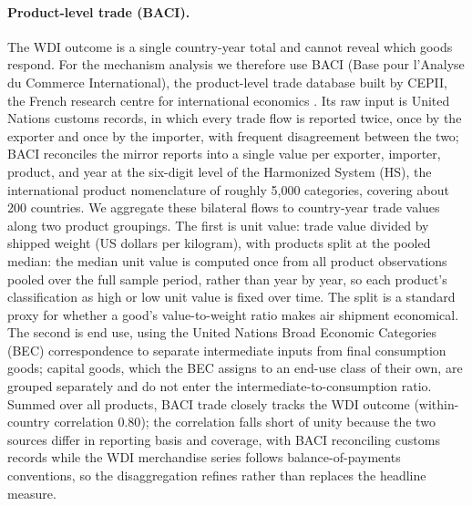 \paragraph{Product-level trade (BACI).} The WDI outcome is a single
country-year total and cannot reveal which goods respond. For the mechanism
analysis we therefore use BACI (Base pour l'Analyse du Commerce
International), the product-level trade database built by CEPII, the French
research centre for international economics \citep{Gaulier_2010}. Its raw
input is United Nations customs records, in which every trade flow is
reported twice, once by the exporter and once by the importer, with frequent
disagreement between the two; BACI reconciles the mirror reports into a
single value per exporter, importer, product, and year at the six-digit
level of the Harmonized System (HS), the international product nomenclature
of roughly 5{,}000 categories, covering about 200 countries. We aggregate
these bilateral flows to country-year trade values along two product
groupings. The first is unit value: trade value divided by shipped weight
(US dollars per kilogram), with products split at the pooled median: the
median unit value is computed once from all product observations pooled
over the full sample period, rather than year by year, so each product's
classification as high or low unit value is fixed over time. The split is a
standard proxy for whether a good's value-to-weight ratio makes air
shipment economical. The second is end use, using the United Nations Broad
Economic Categories (BEC) correspondence to separate intermediate inputs
from final consumption goods; capital goods, which the BEC assigns to an
end-use class of their own, are grouped separately and do not enter the
intermediate-to-consumption ratio. Summed over all products, BACI trade closely
tracks the WDI outcome (within-country correlation $0.80$); the correlation
falls short of unity because the two sources differ in reporting basis and
coverage, with BACI reconciling customs records while the WDI merchandise
series follows balance-of-payments conventions, so the disaggregation
refines rather than replaces the headline measure.

